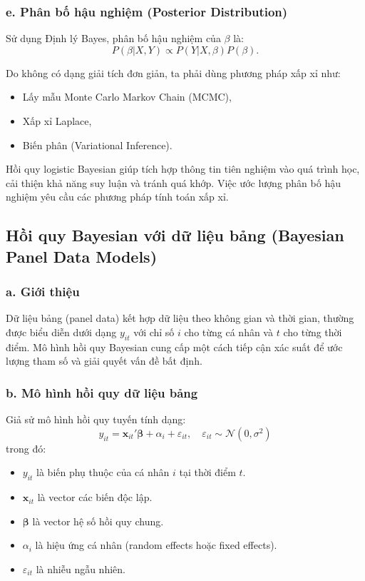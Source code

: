 \subsubsection{e. Phân bố hậu nghiệm (Posterior Distribution)}
Sử dụng Định lý Bayes, phân bố hậu nghiệm của $\beta$ là:
\begin{equation}
    P(\beta | X, Y) \propto P(Y | X, \beta) P(\beta).
\end{equation}

Do không có dạng giải tích đơn giản, ta phải dùng phương pháp xấp xỉ như:
\begin{itemize}
    \item Lấy mẫu Monte Carlo Markov Chain (MCMC),
    \item Xấp xỉ Laplace,
    \item Biến phân (Variational Inference).
\end{itemize}


Hồi quy logistic Bayesian giúp tích hợp thông tin tiên nghiệm vào quá trình học, cải thiện khả năng suy luận và tránh quá khớp. Việc ước lượng phân bố hậu nghiệm yêu cầu các phương pháp tính toán xấp xỉ.

\subsection{Hồi quy Bayesian với dữ liệu bảng (Bayesian Panel Data Models)}
\subsubsection{a. Giới thiệu}
Dữ liệu bảng (panel data) kết hợp dữ liệu theo không gian và thời gian, thường được biểu diễn dưới dạng $y_{it}$ với chỉ số $i$ cho từng cá nhân và $t$ cho từng thời điểm. Mô hình hồi quy Bayesian cung cấp một cách tiếp cận xác suất để ước lượng tham số và giải quyết vấn đề bất định.

\subsubsection{b. Mô hình hồi quy dữ liệu bảng}
Giả sử mô hình hồi quy tuyến tính dạng:
\begin{equation}
    y_{it} = \mathbf{x}_{it}'\boldsymbol{\beta} + \alpha_i + \varepsilon_{it}, \quad \varepsilon_{it} \sim \mathcal{N}(0, \sigma^2)
\end{equation}
trong đó:
\begin{itemize}
    \item $y_{it}$ là biến phụ thuộc của cá nhân $i$ tại thời điểm $t$.
    \item $\mathbf{x}_{it}$ là vector các biến độc lập.
    \item $\boldsymbol{\beta}$ là vector hệ số hồi quy chung.
    \item $\alpha_i$ là hiệu ứng cá nhân (random effects hoặc fixed effects).
    \item $\varepsilon_{it}$ là nhiễu ngẫu nhiên.
\end{itemize}

